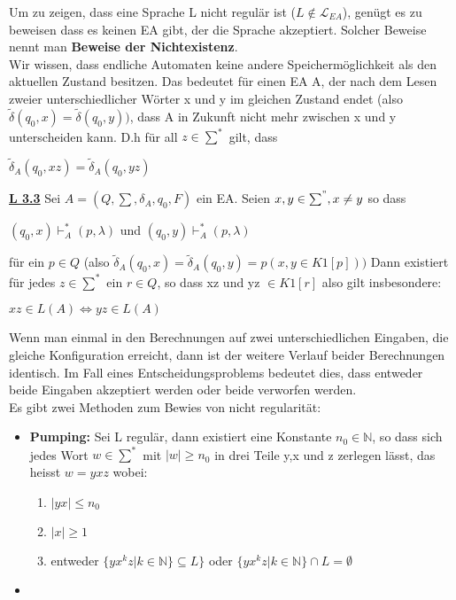 \documentclass[8pt]{extreport}
\begin{document}
Um zu zeigen, dass eine Sprache L nicht regulär ist ($L \notin \mathcal{L}_{EA}$), genügt es zu beweisen dass es keinen EA gibt, der die Sprache akzeptiert. Solcher Beweise nennt man \textbf{Beweise der Nichtexistenz}.\\
Wir wissen, dass endliche Automaten keine andere Speichermöglichkeit als den aktuellen Zustand besitzen. Das bedeutet für einen EA A, der nach dem Lesen zweier unterschiedlicher Wörter x und y im gleichen Zustand endet (also $\tilde{\delta}(q_0,x) =\tilde{\delta}(q_0,y)) $, dass A in Zukunft nicht mehr zwischen x und y unterscheiden kann. D.h für all $z \in \sum^*$ gilt, dass
\begin{center}
$\tilde{\delta}_A(q_0,xz) = \tilde{\delta}_A(q_0,yz)$
\end{center}

\underline{\textbf{L 3.3}} Sei $A=(Q,\sum,\delta_A,q_0,F)$ ein EA. Seien $x,y \in \sum^", x \neq y$ so dass 
\begin{center}
$(q_0,x) \vdash_A^* (p, \lambda)$ und $(q_0,y) \vdash_A^* (p, \lambda)$
\end{center}
für ein $p \in Q$ (also $\tilde{\delta}_A(q_0,x) = \tilde{\delta}_A(q_0,y) = p (x,y \in K1[p]))$ Dann existiert für jedes $z \in \sum^*$ ein $r \in Q$, so dass xz und yz $\in K1[r]$ also gilt insbesondere:
\begin{center}
$xz \in L(A) \iff yz \in L(A)$
\end{center}
Wenn man einmal in den Berechnungen auf zwei unterschiedlichen Eingaben, die gleiche Konfiguration erreicht, dann ist der weitere Verlauf beider Berechnungen identisch. Im Fall eines Entscheidungsproblems bedeutet dies, dass entweder beide Eingaben akzeptiert werden oder beide verworfen werden. \\

Es gibt zwei Methoden zum Bewies von nicht regularität:
\begin{itemize}
\item \textbf{Pumping:} Sei L regulär, dann existiert eine Konstante $n_0 \in \mathbb{N}$, so dass sich jedes Wort $w \in \sum^*$ mit $|w| \geq n_0$ in drei Teile y,x und z zerlegen lässt, das heisst $w = yxz$ wobei:
\begin{enumerate}
\item $|yx| \leq n_0$
\item $|x| \geq 1$
\item entweder $\{yx^kz| k \in \mathbb{N}\} \subseteq L\}$ oder $\{yx^kz | k \in \mathbb{N}\} \cap L = \emptyset$
\end{enumerate}
\item
\end{itemize}
\end{document}
